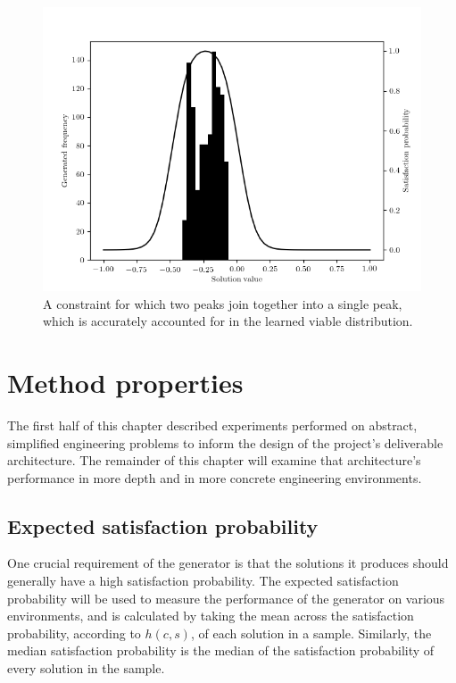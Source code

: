 \documentclass[../../main.tex]{subfiles}
\begin{document}
\begin{figure}[H]
    \begin{center}
    \includegraphics[width=\textwidth]{embeddedConstraint7}
    \caption{
        A constraint for which two peaks join together into a single peak, which is accurately accounted for in the learned viable distribution.
    }
    \label{fig:embeddedConstraintJoinedModes}
    \end{center}
\end{figure}

\section{Method properties}

The first half of this chapter described experiments performed on abstract, simplified engineering problems to inform the design of the project's deliverable architecture.
The remainder of this chapter will examine that architecture's performance in more depth and in more concrete engineering environments.

\subsection{Expected satisfaction probability}

One crucial requirement of the generator is that the solutions it produces should generally have a high satisfaction probability.
The expected satisfaction probability will be used to measure the performance of the generator on various environments, and is calculated by taking the mean across the satisfaction probability, according to $h(c,s)$, of each solution in a sample.
Similarly, the median satisfaction probability is the median of the satisfaction probability of every solution in the sample.
\end{document}
